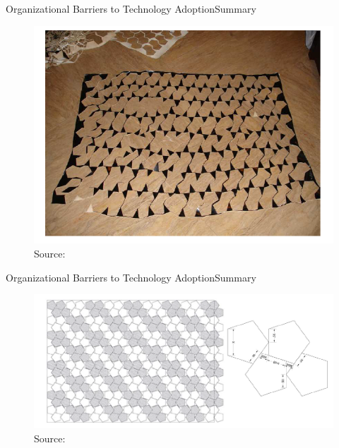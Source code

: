 \documentclass{beamer}
\begin{document}
\begin{frame}{Organizational Barriers to Technology Adoption}{Summary}
\begin{figure}[h]
\begin{centering}
  \includegraphics[width=\textwidth]{atkin1}
  \caption{Source: \cite{Atkin2015}}
   \label{fig:atkin1}
\end{centering}
\end{figure}
\end{frame}

\begin{frame}{Organizational Barriers to Technology Adoption}{Summary}
\begin{figure}[h]
\begin{centering}
  \includegraphics[width=\textwidth]{atkin2}
  \caption{Source: \cite{Atkin2015}}
   \label{fig:atkin2}
\end{centering}
\end{figure}
\end{frame}
\end{document}
